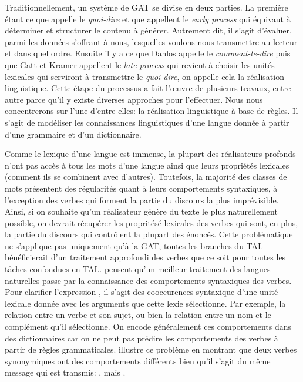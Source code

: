 Traditionnellement, un système de \ac{GAT} se divise en deux parties. La première étant ce que \cite{DanlosPresentationmodelegeneration1983} appelle le \emph{quoi-dire} et que \cite{gatt18} appellent le \emph{early process} qui équivaut à déterminer et structurer le contenu à générer. Autrement dit, il s'agit d'évaluer, parmi les données s'offrant à nous, lesquelles voulons-nous transmettre au lecteur et dans quel ordre. Ensuite il y a ce que Danlos appelle le \emph{comment-le-dire} puis que Gatt et Kramer appellent le \emph{late process} qui revient à choisir les unités lexicales qui serviront à transmettre le \emph{quoi-dire}, on appelle cela la réalisation linguistique. Cette étape du processus a fait l'\oe{}uvre de plusieurs travaux, entre autre parce qu'il y existe diverses approches pour l'effectuer. Nous nous concentrerons sur l'une d'entre elles: la réalisation linguistique à base de règles. Il s'agit de modéliser les connaissances linguistiques d'une langue donnée à partir d'une grammaire et d'un dictionnaire. 

Comme le lexique d'une langue est immense, la plupart des réalisateurs profonds n'ont pas accès à tous les mots d'une langue ainsi que leurs propriétés lexicales (comment ils se combinent avec d'autres). Toutefois, la majorité des classes de mots présentent des régularités quant à leurs comportements syntaxiques, à l'exception des verbes qui forment la partie du discours la plus imprévisible. Ainsi, si on souhaite qu'un réalisateur génère du texte le plus naturellement possible, on devrait récupérer les propritésé lexicales des verbes qui sont, en plus, la partie du discours qui contrôlent la plupart des énoncés. Cette problématique ne s'applique pas uniquement qu'à la \ac{GAT}, toutes les branches du \ac{TAL} bénéficierait d'un traitement approfondi des verbes que ce soit pour toutes les tâches confondues en \ac{TAL}. \cite{SchulerVerbnetBroadcoverageComprehensive2005,Korhonenlargesubcategorizationlexicon2006} pensent qu'un meilleur traitement des langues naturelles passe par la connaissance des comportements syntaxiques des verbes. Pour clarifier l'expression , il s'agit des cooccurences syntaxique d'une unité lexicale donnée avec les arguments que cette lexie sélectionne. Par exemple, la relation entre un verbe et son sujet, ou bien la relation entre un nom et le complément qu'il sélectionne. On encode généralement ces comportements dans des dictionnaires car on ne peut pas prédire les comportements des verbes à partir de règles grammaticales. \cite{MilicevicSchemaregimepont2009} illustre ce problème en montrant que deux verbes synonymiques ont des comportements différents bien qu'il s'agit du même message qui est transmis: , mais .


